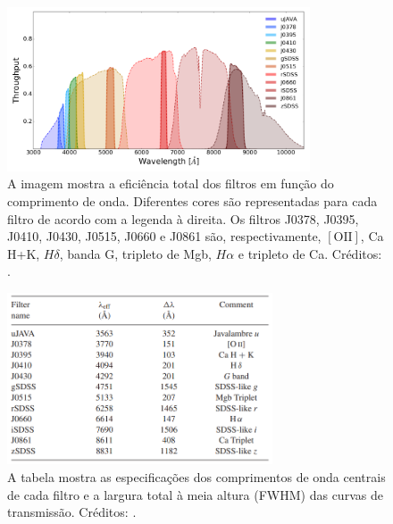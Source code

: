 \begin{figure}[h]
  \centering 
  \includegraphics[width=0.8\textwidth]{Imagens/dozefiltros.PNG} 
  \caption[Sistema de 12 filtros do S-PLUS.]{A imagem mostra a eficiência total dos filtros em função do comprimento de onda. Diferentes cores são representadas para cada filtro de acordo com a legenda à direita. Os filtros J0378, J0395, J0410, J0430, J0515, J0660 e J0861 são, respectivamente, $[\text{OII}]$, Ca H+K, $H \delta$, banda G, tripleto de Mgb, $H \alpha$ e tripleto de Ca. Créditos: .}
  \label{fig:dozefiltros} 
\end{figure}

\begin{figure}[h]
  \centering 
  \includegraphics[width=0.7\textwidth]{Imagens/filtros.PNG} 
  \caption[Sumário dos filtros do S-PLUS.]{A tabela mostra as especificações dos comprimentos de onda centrais de cada filtro e a largura total à meia altura (FWHM\footnotemark[8]) das curvas de transmissão. Créditos: .}
  \label{fig:filtros} 
\end{figure}

